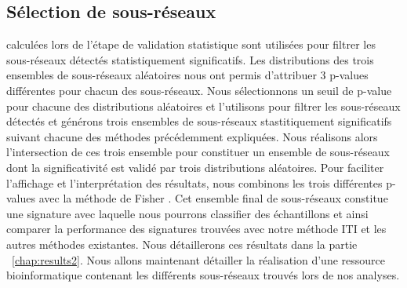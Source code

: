 		\subsection{\textcolor{mygreen}{Sélection de sous-réseaux}}
			 calculées lors de l'étape de validation statistique sont utilisées pour filtrer les sous-réseaux détectés statistiquement significatifs.
			Les distributions des trois ensembles de sous-réseaux aléatoires nous ont permis d'attribuer 3 p-values différentes pour chacun des sous-réseaux.
			Nous sélectionnons un seuil de p-value pour chacune des distributions aléatoires et l'utilisons pour filtrer les sous-réseaux détectés et générons trois ensembles de sous-réseaux stastitiquement significatifs suivant chacune des méthodes précédemment expliquées.
			Nous réalisons alors l'intersection de ces trois ensemble pour constituer un ensemble de sous-réseaux dont la significativité est validé par trois distributions aléatoires.
			Pour faciliter l'affichage et l'interprétation des résultats, nous combinons les trois différentes p-values avec la méthode de Fisher \citep{Fisher1925}.
			Cet ensemble final de sous-réseaux constitue une signature avec laquelle nous pourrons classifier des échantillons et ainsi comparer la performance des signatures trouvées avec notre méthode ITI et les autres méthodes existantes.
			Nous détaillerons ces résultats dans la partie ~\ref{chap:results2}.
			Nous allons maintenant détailler la réalisation d'une ressource bioinformatique contenant les différents sous-réseaux trouvés lors de nos analyses.

